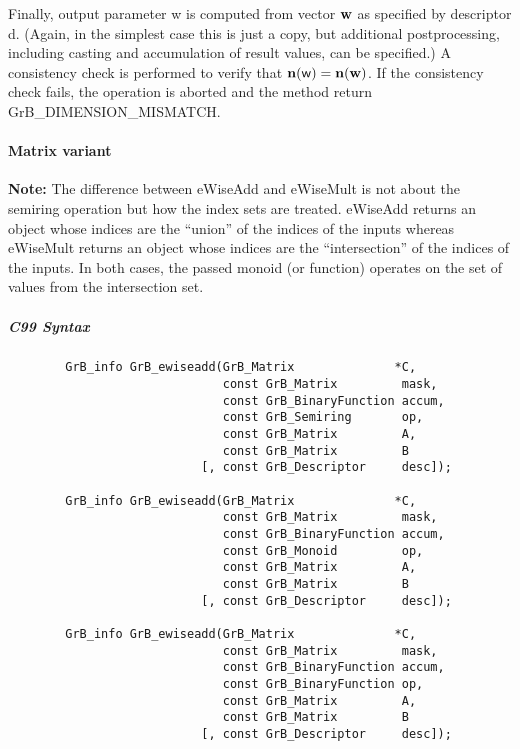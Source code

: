 Finally, output parameter {\sf w} is computed from vector ${\bf w}$
as specified by descriptor {\sf d}. (Again, in the simplest case this
is just a copy, but additional postprocessing, including casting and
accumulation of result values, can be specified.)  A consistency check is
performed to verify that $\bold{n}({\sf w}) = \bold{n}({\bf w})$. If
the consistency check fails, the operation is aborted and the method
return {\sf GrB\_DIMENSION\_MISMATCH}.


\paragraph{Matrix variant}

{\bf Note:} The difference between {\sf eWiseAdd} and {\sf eWiseMult} is not about the semiring operation but how the index sets are treated.
{\sf eWiseAdd} returns an object whose indices are the ``union'' of the indices of the inputs whereas  
{\sf eWiseMult} returns an object whose indices are the ``intersection'' of the indices of the inputs. In both cases, the passed monoid (or function) operates on the 
set of values from the intersection set. 

\subparagraph{C99 Syntax}

\begin{verbatim}
        GrB_info GrB_ewiseadd(GrB_Matrix              *C,
                              const GrB_Matrix         mask,
                              const GrB_BinaryFunction accum,
                              const GrB_Semiring       op, 
                              const GrB_Matrix         A,
                              const GrB_Matrix         B
                           [, const GrB_Descriptor     desc]);
                            
        GrB_info GrB_ewiseadd(GrB_Matrix              *C,
                              const GrB_Matrix         mask,
                              const GrB_BinaryFunction accum,
                              const GrB_Monoid         op, 
                              const GrB_Matrix         A,
                              const GrB_Matrix         B
                           [, const GrB_Descriptor     desc]);
                            
        GrB_info GrB_ewiseadd(GrB_Matrix              *C,
                              const GrB_Matrix         mask,
                              const GrB_BinaryFunction accum,
                              const GrB_BinaryFunction op, 
                              const GrB_Matrix         A,
                              const GrB_Matrix         B
                           [, const GrB_Descriptor     desc]);
\end{verbatim}

